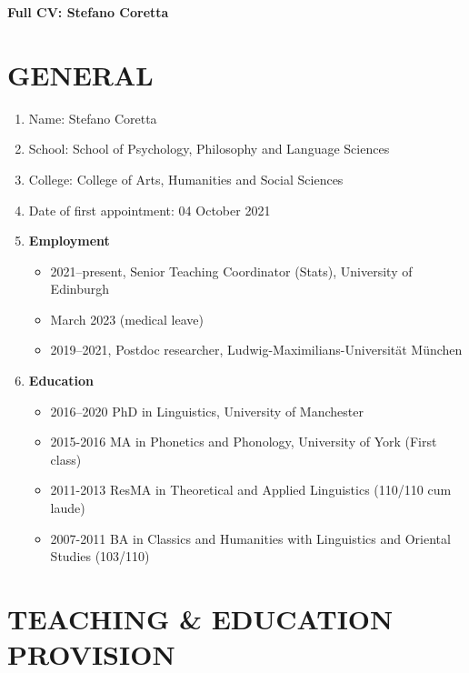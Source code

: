 \documentclass{article}
\begin{document}
{\Huge \textbf{Full CV: Stefano Coretta}}

\section{GENERAL}

\begin{enumerate}
\item Name: Stefano Coretta
\item School: School of Psychology, Philosophy and Language Sciences
\item College: College of Arts, Humanities and Social Sciences
\item Date of first appointment: 04 October 2021
\item \textbf{Employment}
	\begin{itemize}
	\item 2021--present, Senior Teaching Coordinator (Stats), University of Edinburgh
	\item March 2023 (medical leave)
	\item 2019--2021, Postdoc researcher, Ludwig-Maximilians-Universität München
	\end{itemize}
\item \textbf{Education}
	\begin{itemize}
	\item 2016--2020 PhD in Linguistics, University of Manchester
	\item 2015-2016 MA in Phonetics and Phonology, University of York (First class)
	\item 2011-2013 ResMA in Theoretical and Applied Linguistics (110/110 cum laude)
	\item 2007-2011 BA in Classics and Humanities with Linguistics and Oriental Studies (103/110)
	\end{itemize}
\end{enumerate}

\section{TEACHING \& EDUCATION PROVISION}
\end{document}
